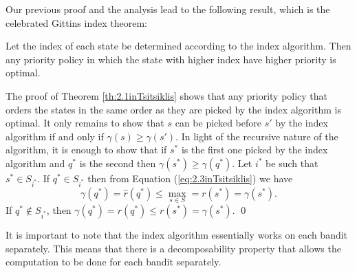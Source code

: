 Our previous proof and the analysis lead to the following result, which is the celebrated Gittins index theorem:
\begin{theorem}
Let the index of each state be determined according to the index algorithm. Then any priority policy in which the state with higher index have higher priority is optimal.
\end{theorem}
\proof
The proof of Theorem \ref{th:2.1inTsitsiklis} shows that any priority policy that orders the states in the same order as they are picked by the index algorithm is optimal. It only remains to show that $s$ can be picked before $s'$ by the index algorithm if and only if $\gamma(s)\ge \gamma(s')$. In light of the recursive nature of the algorithm, it is enough to show that if $s^*$ is the first one picked by the index algorithm and $q^*$ is the second then $\gamma(s^*)\ge \gamma(q^*)$. Let $i^*$ be such that $s^*\in S_{i^*}$. If $q^*\in S_{i^*}$ then from Equation (\ref{eq:2.3inTsitsiklis}) we have
$$
\gamma(q^*) = \hat{r}(q^*) \le \max_{s\in S} = r(s^*) = \gamma(s^*).
$$
If $q^*\not \in S_{i^*}$, then $\gamma(q^*) = r(q^*) \le r(s^*) = \gamma(s^*)$. \qed

\medskip

It is important to note that the index algorithm essentially works on each bandit separately. This means that there is a decomposability property that allows the computation to be done for each bandit separately.
%
%
